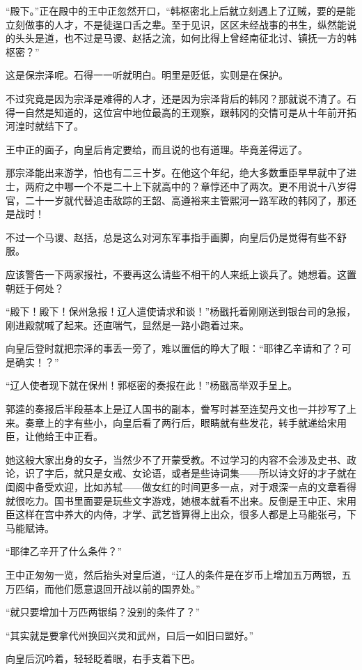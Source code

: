 “殿下。”正在殿中的王中正忽然开口，“韩枢密北上后就立刻遇上了辽贼，要的是能立刻做事的人才，不是徒逞口舌之辈。至于见识，区区未经战事的书生，纵然能说的头头是道，也不过是马谡、赵括之流，如何比得上曾经南征北讨、镇抚一方的韩枢密？”

这是保宗泽呢。石得一一听就明白。明里是贬低，实则是在保护。

不过究竟是因为宗泽是难得的人才，还是因为宗泽背后的韩冈？那就说不清了。石得一自然是知道的，这位宫中地位最高的王观察，跟韩冈的交情可是从十年前开拓河湟时就结下了。

王中正的面子，向皇后肯定要给，而且说的也有道理。毕竟差得远了。

那宗泽能出来游学，怕也有二三十岁。在他这个年纪，绝大多数重臣早早就中了进士，两府之中哪一个不是二十上下就高中的？章惇还中了两次。更不用说十八岁得官，二十一岁就代替追击敌踪的王韶、高遵裕来主管熙河一路军政的韩冈了，那还是战时！

不过一个马谡、赵括，总是这么对河东军事指手画脚，向皇后仍是觉得有些不舒服。

应该警告一下两家报社，不要再这么请些不相干的人来纸上谈兵了。她想着。这置朝廷于何处？

“殿下！殿下！保州急报！辽人遣使请求和谈！”杨戬托着刚刚送到银台司的急报，刚进殿就喊了起来。还直喘气，显然是一路小跑着过来。

向皇后登时就把宗泽的事丢一旁了，难以置信的睁大了眼：“耶律乙辛请和了？可是确实！？”

“辽人使者现下就在保州！郭枢密的奏报在此！”杨戬高举双手呈上。

郭逵的奏报后半段基本上是辽人国书的副本，誊写时甚至连契丹文也一并抄写了上来。奏章上的字有些小，向皇后看了两行后，眼睛就有些发花，转手就递给宋用臣，让他给王中正看。

她这般大家出身的女子，当然少不了开蒙受教。不过学习的内容不会涉及史书、政论，识了字后，就只是女戒、女论语，或者是些诗词集——所以诗文好的才子就在闺阁中备受欢迎，比如苏轼——做女红的时间更多一点，对于艰深一点的文章看得就很吃力。国书里面要是玩些文字游戏，她根本就看不出来。反倒是王中正、宋用臣这样在宫中养大的内侍，才学、武艺皆算得上出众，很多人都是上马能张弓，下马能赋诗。

“耶律乙辛开了什么条件？”

王中正匆匆一览，然后抬头对皇后道，“辽人的条件是在岁币上增加五万两银，五万匹绢，而他们愿意退回开战以前的国界处。”

“就只要增加十万匹两银绢？没别的条件了？”

“其实就是要拿代州换回兴灵和武州，曰后一如旧曰盟好。”

向皇后沉吟着，轻轻眨着眼，右手支着下巴。

